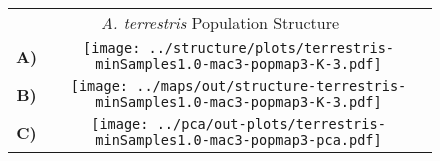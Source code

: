 \documentclass[border=10pt,varwidth=30cm]{standalone}
\begin{document}
\begin{figure}
\begin{tabular}[t]{cc}
    \multicolumn{2}{c}{\Large \textit{A. terrestris} Population Structure} \\
  {\textbf{\large A)}} & \texttt{[image: ../structure/plots/terrestris-minSamples1.0-mac3-popmap3-K-3.pdf]} \\ \vspace{1mm}
  {\textbf{\large B)}} & \texttt{[image: ../maps/out/structure-terrestris-minSamples1.0-mac3-popmap3-K-3.pdf]} \\
  {\textbf{\large C)}} & \texttt{[image: ../pca/out-plots/terrestris-minSamples1.0-mac3-popmap3-pca.pdf]} \\
\end{tabular}
\end{figure}
\end{document}
